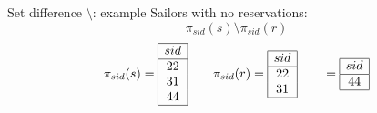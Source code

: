 \documentclass[10pt,aspectratio=169]{beamer}
\newcommand{\proj}{\pi}
\begin{document}
\begin{frame}{Set difference \(\setminus\): example}
\small
Sailors with no reservations:
\[
\proj_{sid}(s)\setminus \proj_{sid}(r)
\]
\[
\proj_{sid}(s)=\begin{array}{|c|}\hline sid\\\hline 22\\31\\44\\\hline\end{array}
\qquad
\proj_{sid}(r)=\begin{array}{|c|}\hline sid\\\hline 22\\31\\\hline\end{array}
\qquad
=\begin{array}{|c|}\hline sid\\\hline 44\\\hline\end{array}
\]
\end{frame}
\end{document}
